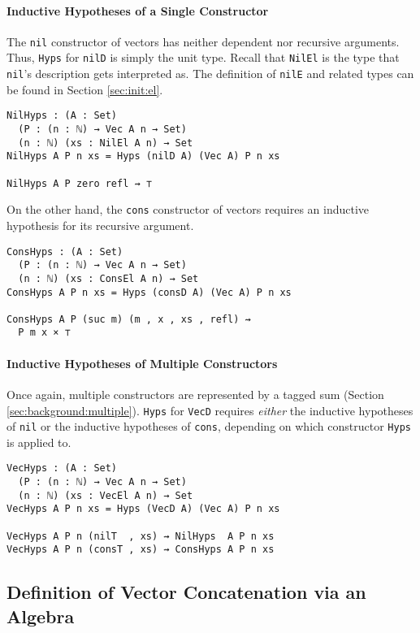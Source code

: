 \documentclass[nonatbib]{sigplanconf}
\newcommand{\refsec}[1]{Section \ref{sec:#1}}
\begin{document}
\paragraph{Inductive Hypotheses of a Single Constructor}

The {\tt nil} constructor of vectors has neither dependent nor
recursive arguments. Thus, {\tt Hyps} for {\tt nilD} is simply
the unit type. Recall that {\tt NilEl} is the type that
{\tt nil}'s description gets interpreted as. The definition of
{\tt nilE} and related types can be found in \refsec{init:el}.

\begin{verbatim}
NilHyps : (A : Set)
  (P : (n : ℕ) → Vec A n → Set)
  (n : ℕ) (xs : NilEl A n) → Set
NilHyps A P n xs = Hyps (nilD A) (Vec A) P n xs

NilHyps A P zero refl ⇝ ⊤
\end{verbatim}

On the other hand, the {\tt cons} constructor of vectors requires an
inductive hypothesis for its recursive argument.

\begin{verbatim}
ConsHyps : (A : Set)
  (P : (n : ℕ) → Vec A n → Set)
  (n : ℕ) (xs : ConsEl A n) → Set
ConsHyps A P n xs = Hyps (consD A) (Vec A) P n xs

ConsHyps A P (suc m) (m , x , xs , refl) ⇝
  P m x × ⊤
\end{verbatim}

\paragraph{Inductive Hypotheses of Multiple Constructors}

Once again, multiple constructors are represented by a tagged
sum (\refsec{background:multiple}). {\tt Hyps} for
{\tt VecD} requires {\it either} the inductive hypotheses of
{\tt nil} or the inductive hypotheses of {\tt cons}, depending on
which constructor {\tt Hyps} is applied to.

\begin{verbatim}
VecHyps : (A : Set)
  (P : (n : ℕ) → Vec A n → Set)
  (n : ℕ) (xs : VecEl A n) → Set
VecHyps A P n xs = Hyps (VecD A) (Vec A) P n xs

VecHyps A P n (nilT  , xs) ⇝ NilHyps  A P n xs 
VecHyps A P n (consT , xs) ⇝ ConsHyps A P n xs 
\end{verbatim}

\subsection{Definition of Vector Concatenation via an Algebra}
\end{document}
